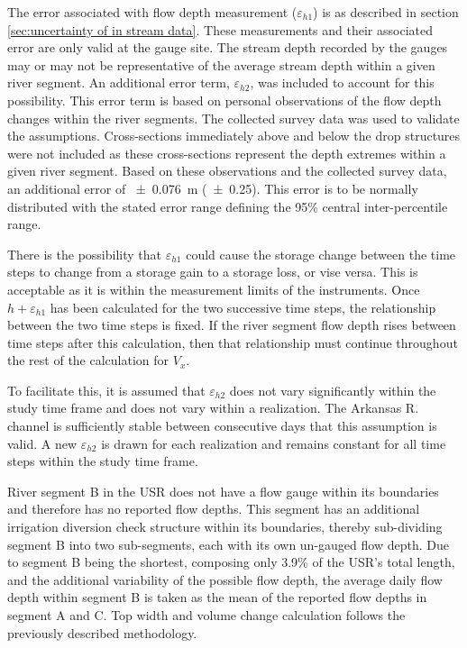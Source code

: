 \begin{linenumbers}
The error associated with flow depth measurement ($\varepsilon_{h1}$) is as described in section \ref{sec:uncertainty of in stream data}.  These measurements and their associated error are only valid at the gauge site.  The stream depth recorded by the gauges may or may not be representative of the average stream depth within a given river segment.  An additional error term, $\varepsilon_{h2}$, was included to account for this possibility.  This error term is based on personal observations of the flow depth changes within the river segments.  The collected survey data was used to validate the assumptions.  Cross-sections immediately above and below the drop structures were not included as these cross-sections represent the depth extremes within a given river segment.  Based on these observations and the collected survey data, an additional error of \SI{\pm 0.076}{\meter} (\SI{\pm 0.25}{\foot}).  This error is to be normally distributed with the stated error range defining the 95\% central inter-percentile range.

There is the possibility that $\varepsilon_{h1}$ could cause the storage change between the time steps to change from a storage gain to a storage loss, or vise versa.  This is acceptable as it is within the measurement limits of the instruments.  Once $h+\varepsilon_{h1}$ has been calculated for the two successive time steps, the relationship between the two time steps is fixed.  If the river segment flow depth rises between time steps after this calculation, then that relationship must continue throughout the rest of the calculation for $V_x$.

To facilitate this, it is assumed that $\varepsilon_{h2}$ does not vary significantly within the study time frame and does not vary within a realization.  The Arkansas R. channel is sufficiently stable between consecutive days that this assumption is valid.  A new $\varepsilon_{h2}$ is drawn for each realization and remains constant for all time steps within the study time frame.

River segment B in the USR does not have a flow gauge within its boundaries and therefore has no reported flow depths. This segment has an additional irrigation diversion check structure within its boundaries, thereby sub-dividing segment B into two sub-segments, each with its own un-gauged flow depth.  Due to segment B being the shortest, composing only 3.9\% of the USR's total length, and the additional variability of the possible flow depth, the average daily flow depth within segment B is taken as the mean of the reported flow depths in segment A and C.  Top width and volume change calculation follows the previously described methodology.


\end{linenumbers}
